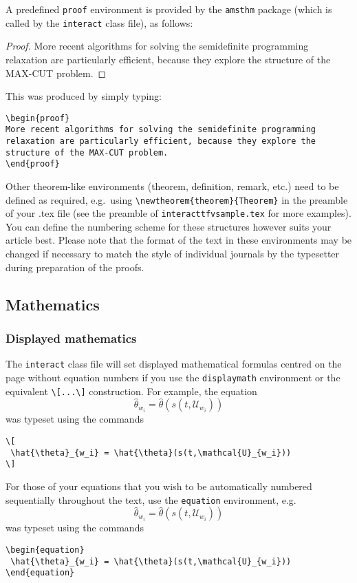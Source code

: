 \documentclass[]{interact}
\theoremstyle{plain}%
\theoremstyle{definition}
\theoremstyle{remark}
\begin{document}
A predefined \verb"proof" environment is provided by the \texttt{amsthm} package (which is called by the \texttt{interact} class file), as follows:
\begin{proof}
More recent algorithms for solving the semidefinite programming relaxation are particularly efficient, because they explore the structure of the MAX-CUT problem.
\end{proof}
\noindent This was produced by simply typing:
\begin{verbatim}
\begin{proof}
More recent algorithms for solving the semidefinite programming
relaxation are particularly efficient, because they explore the
structure of the MAX-CUT problem.
\end{proof}
\end{verbatim}
Other theorem-like environments (theorem, definition, remark, etc.) need to be defined as required, e.g.\ using \verb"\newtheorem{theorem}{Theorem}" in the preamble of your .tex file (see the preamble of \verb"interacttfvsample.tex" for more examples). You can define the numbering scheme for these structures however suits your article best. Please note that the format of the text in these environments may be changed if necessary to match the style of individual journals by the typesetter during preparation of the proofs.


\subsection{Mathematics}

\subsubsection{Displayed mathematics}

The \texttt{interact} class file will set displayed mathematical formulas centred on the page without equation numbers if you use the \texttt{displaymath} environment or the equivalent \verb"\[...\]" construction. For example, the equation
\[
 \hat{\theta}_{w_i} = \hat{\theta}(s(t,\mathcal{U}_{w_i}))
\]
was typeset using the commands
\begin{verbatim}
\[
 \hat{\theta}_{w_i} = \hat{\theta}(s(t,\mathcal{U}_{w_i}))
\]
\end{verbatim}

For those of your equations that you wish to be automatically numbered sequentially throughout the text, use the \texttt{equation} environment, e.g.
\begin{equation}
 \hat{\theta}_{w_i} = \hat{\theta}(s(t,\mathcal{U}_{w_i}))
\end{equation}
was typeset using the commands
\begin{verbatim}
\begin{equation}
 \hat{\theta}_{w_i} = \hat{\theta}(s(t,\mathcal{U}_{w_i}))
\end{equation}
\end{verbatim}
\end{document}
